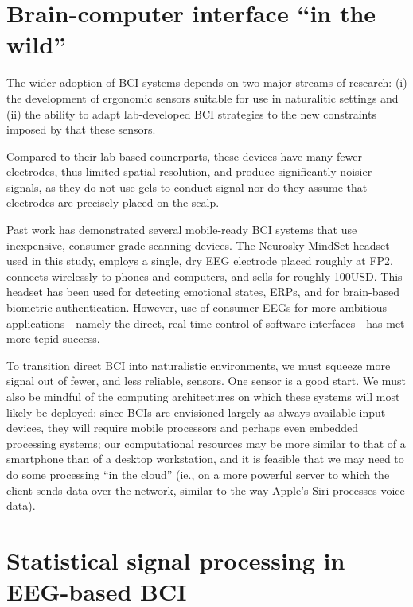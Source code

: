 
\section{Brain-computer interface ``in the wild''}
The wider adoption of BCI systems depends on two major streams of research: (i) the development of ergonomic sensors suitable for use in naturalitic settings and (ii) the ability to adapt lab-developed BCI strategies to the new constraints imposed by that these sensors.


Compared to their lab-based counerparts, these devices have many fewer electrodes, thus limited spatial resolution, and produce significantly noisier signals, as they do not use gels to conduct signal nor do they assume that electrodes are precisely placed on the scalp.


Past work has demonstrated several mobile-ready BCI systems that use inexpensive, consumer-grade scanning devices. \cite{campbell_neurophone:_2010} The Neurosky MindSet headset used in this study, employs a single, dry EEG electrode placed roughly at FP2, connects wirelessly to phones and computers, and sells for roughly 100USD. This headset has been used for detecting emotional states, ERPs, and for brain-based biometric authentication. \cite{crowley_evaluating_2010,grierson_better_2011,adams_i_2013} However, use of consumer EEGs for more ambitious applications - namely the direct, real-time control of software interfaces - has met more tepid success. \cite{carrino_self-paced_2012,larsen_classification_2011} 

To transition direct BCI into naturalistic environments, we must squeeze more signal out of fewer, and less reliable, sensors. One sensor is a good start. We must also be mindful of the computing architectures on which these systems will most likely be deployed: since BCIs are envisioned largely as always-available input devices, they will require mobile processors and perhaps even embedded processing systems; our computational resources may be more similar to that of a smartphone than of a desktop workstation, and it is feasible that we may need to do some processing ``in the cloud'' (ie., on a more powerful server to which the client sends data over the network, similar to the way Apple's Siri processes voice data). 

\section{Statistical signal processing in EEG-based BCI}

